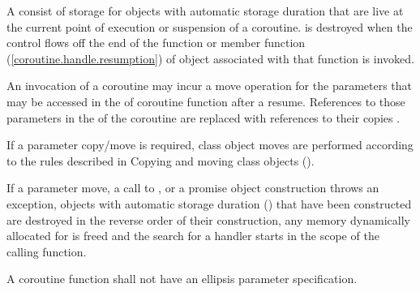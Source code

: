 \pnum
A  consist of 
storage for objects with automatic storage duration
that are live at the current point of execution or suspension of 
a coroutine.
 is destroyed when
the control flows off the end of the function or
 member function (\ref{coroutine.handle.resumption}) of  object associated with that function is invoked.

\pnum
An invocation of a coroutine may incur a move operation for the parameters that may be accessed in the 
of coroutine function after a resume. 
References to those parameters in the 
of the coroutine are replaced with 
references to their copies .

\pnum
If a parameter copy/move is required, class object moves are performed according to the rules described in Copying and moving class objects ().

\pnum
If a parameter move, a call to , or a promise object construction throws
an exception, objects with automatic storage duration () that have been
constructed are destroyed in the reverse order of their construction, any memory dynamically allocated 
for  is freed
and the search for a handler starts in the scope of the calling function. 

\pnum
A coroutine function shall not have an ellipsis parameter specification. 


%

